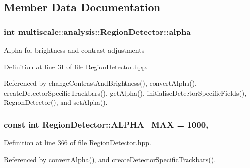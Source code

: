 \subsection{Member Data Documentation}
\hypertarget{classmultiscale_1_1analysis_1_1RegionDetector_ab768a3bbfff9835b441a889ab2cb05a6}{
\subsubsection[{alpha}]{\setlength{\rightskip}{0pt plus 5cm}int multiscale\-::analysis\-::\-Region\-Detector\-::alpha\hspace{0.3cm}{\ttfamily [private]}}}\label{classmultiscale_1_1analysis_1_1RegionDetector_ab768a3bbfff9835b441a889ab2cb05a6}
Alpha for brightness and contrast adjustments 

Definition at line 31 of file Region\-Detector.\-hpp.



Referenced by change\-Contrast\-And\-Brightness(), convert\-Alpha(), create\-Detector\-Specific\-Trackbars(), get\-Alpha(), initialise\-Detector\-Specific\-Fields(), Region\-Detector(), and set\-Alpha().

\hypertarget{classmultiscale_1_1analysis_1_1RegionDetector_a7ca1e136dc9d768f1e11cd6f770d950f}{
\subsubsection[{A\-L\-P\-H\-A\-\_\-\-M\-A\-X}]{\setlength{\rightskip}{0pt plus 5cm}const int Region\-Detector\-::\-A\-L\-P\-H\-A\-\_\-\-M\-A\-X = 1000\hspace{0.3cm}{\ttfamily [static]}, {\ttfamily [private]}}}\label{classmultiscale_1_1analysis_1_1RegionDetector_a7ca1e136dc9d768f1e11cd6f770d950f}


Definition at line 366 of file Region\-Detector.\-hpp.



Referenced by convert\-Alpha(), and create\-Detector\-Specific\-Trackbars().

